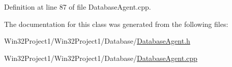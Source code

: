 Definition at line 87 of file Database\+Agent.\+cpp.



The documentation for this class was generated from the following files\+:\begin{DoxyCompactItemize}
\item 
Win32\+Project1/\+Win32\+Project1/\+Database/\hyperlink{_database_agent_8h}{Database\+Agent.\+h}\item 
Win32\+Project1/\+Win32\+Project1/\+Database/\hyperlink{_database_agent_8cpp}{Database\+Agent.\+cpp}\end{DoxyCompactItemize}
